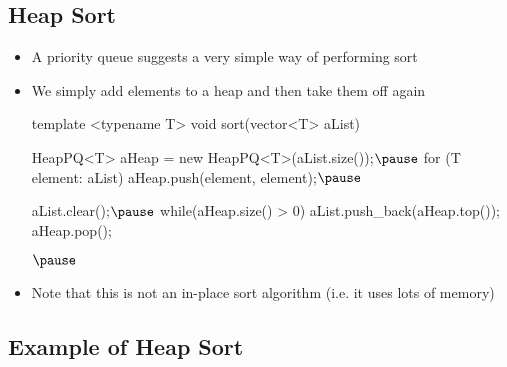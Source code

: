 \Outline %

\begin{slide}
\section[-2]{Heap Sort}

\begin{PauseHighLight}
  \begin{itemize}
  \item A priority queue suggests a very simple way of performing
    sort\pause
  \item We simply add elements to a heap and then take them off
  again
  \begin{java}
    template <typename T>
    void sort(vector<T> aList)
    {
        HeapPQ<T> aHeap = new HeapPQ<T>(aList.size());$\pause$
        for (T element: aList)
          aHeap.push(element, element);$\pause$

        aList.clear();$\pause$
        while(aHeap.size() > 0) {
          aList.push_back(aHeap.top());
          aHeap.pop();
        }
    }$\pause$
  \end{java}
  \item Note that this is not an in-place sort algorithm (i.e. it uses
    lots of memory)\pause
  \end{itemize}
\end{PauseHighLight}

\end{slide}


\begin{slide}
\section{Example of Heap Sort}
\pb\pause{}
\begin{center}
  \pause
\end{center}


\end{slide}



